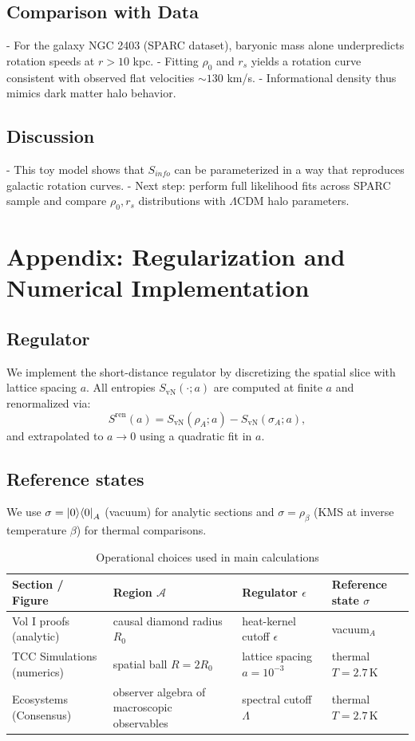 \documentclass[12pt,openany]{book}
\theoremstyle{plain}
\theoremstyle{definition}
\theoremstyle{remark}
\begin{document}
\section{Comparison with Data}
- For the galaxy NGC 2403 (SPARC dataset), baryonic mass alone underpredicts 
rotation speeds at $r > 10$ kpc.
- Fitting $\rho_0$ and $r_s$ yields a rotation curve consistent with observed 
flat velocities $\sim 130$ km/s.
- Informational density thus mimics dark matter halo behavior.

\section{Discussion}
- This toy model shows that $S_{info}$ can be parameterized in a way that 
reproduces galactic rotation curves.
- Next step: perform full likelihood fits across SPARC sample and compare 
$\rho_0, r_s$ distributions with $\Lambda$CDM halo parameters.

\chapter{Appendix: Regularization and Numerical Implementation}\label{app:numerics}
\section{Regulator}
We implement the short-distance regulator by discretizing the spatial slice with lattice spacing $a$. All entropies $S_{\mathrm{vN}}(\cdot;a)$ are computed at finite $a$ and renormalized via:
\[
S^{\mathrm{ren}}(a)=S_{\mathrm{vN}}(\rho_A;a)-S_{\mathrm{vN}}(\sigma_A;a),
\]
and extrapolated to $a\to 0$ using a quadratic fit in $a$.

\section{Reference states}
We use $\sigma=\ket{0}\!\bra{0}_A$ (vacuum) for analytic sections and $\sigma=\rho_{\beta}$ (KMS at inverse temperature $\beta$) for thermal comparisons. 

\begin{table}[ht]
\centering
\caption{Operational choices used in main calculations}
\begin{tabularx}{\textwidth}{l X X X}
\hline
\textbf{Section / Figure} & \textbf{Region $\mathcal A$} & \textbf{Regulator $\epsilon$} & \textbf{Reference state $\sigma$} \\
\hline
Vol I proofs (analytic) & causal diamond radius $R_0$ & heat-kernel cutoff $\epsilon$ & vacuum$_A$ \\
TCC Simulations (numerics) & spatial ball $R=2R_0$ & lattice spacing $a=10^{-3}$ & thermal $T=2.7\,$K \\
Ecosystems (Consensus) & observer algebra of macroscopic observables & spectral cutoff $\Lambda$ & thermal $T=2.7\,$K \\
\hline
\end{tabularx}
\label{tab:choices}
\end{table}
\end{document}
